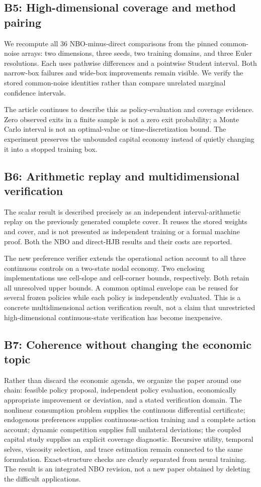 \subsection{B5: High-dimensional coverage and method pairing}
We recompute all 36 NBO-minus-direct comparisons from the pinned common-noise arrays: two dimensions, three seeds, two training domains, and three Euler resolutions. Each uses pathwise differences and a pointwise Student interval. Both narrow-box failures and wide-box improvements remain visible. We verify the stored common-noise identities rather than compare unrelated marginal confidence intervals.

The article continues to describe this as policy-evaluation and coverage evidence. Zero observed exits in a finite sample is not a zero exit probability; a Monte Carlo interval is not an optimal-value or time-discretization bound. The experiment preserves the unbounded capital economy instead of quietly changing it into a stopped training box.

\subsection{B6: Arithmetic replay and multidimensional verification}
The scalar result is described precisely as an independent interval-arithmetic replay on the previously generated complete cover. It reuses the stored weights and cover, and is not presented as independent training or a formal machine proof. Both the NBO and direct-HJB results and their costs are reported.

The new preference verifier extends the operational action account to all three continuous controls on a two-state nodal economy. Two enclosing implementations use cell-slope and cell-corner bounds, respectively. Both retain all unresolved upper bounds. A common optimal envelope can be reused for several frozen policies while each policy is independently evaluated. This is a concrete multidimensional action verification result, not a claim that unrestricted high-dimensional continuous-state verification has become inexpensive.

\subsection{B7: Coherence without changing the economic topic}
Rather than discard the economic agenda, we organize the paper around one chain: feasible policy proposal, independent policy evaluation, economically appropriate improvement or deviation, and a stated verification domain. The nonlinear consumption problem supplies the continuous differential certificate; endogenous preferences supplies continuous-action training and a complete action account; dynamic competition supplies full unilateral deviations; the coupled capital study supplies an explicit coverage diagnostic. Recursive utility, temporal selves, viscosity selection, and trace estimation remain connected to the same formulation. Exact-structure checks are clearly separated from neural training. The result is an integrated NBO revision, not a new paper obtained by deleting the difficult applications.

